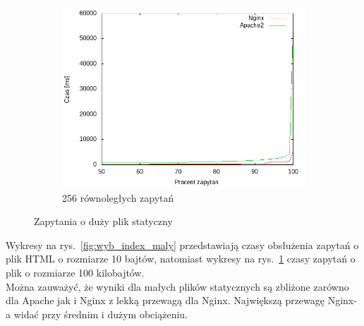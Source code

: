 \begin{figure}
\begin{subfigure}[h]{0.3\textwidth}
		\includegraphics[width=\textwidth]{testy/wybor_index_duzy_256.png}
		\caption{256 równoległych zapytań}
	\end{subfigure}
	\caption{Zapytania o duży plik statyczny}\label{fig:wyb_index_duzy}
\end{figure}
Wykresy na rys.~\ref{fig:wyb_index_maly} przedstawiają czasy obsłużenia zapytań o plik HTML o rozmiarze 10 bajtów, natomiast wykresy na rys.~\ref{fig:wyb_index_duzy} czasy zapytań o plik o rozmiarze 100 kilobajtów.\\
Można zauważyć, że wyniki dla małych plików statycznych są zbliżone zarówno dla Apache jak i Nginx z lekką przewagą dla Nginx.
Największą przewagę Nginx-a widać przy średnim i dużym obciążeniu.
\clearpage
